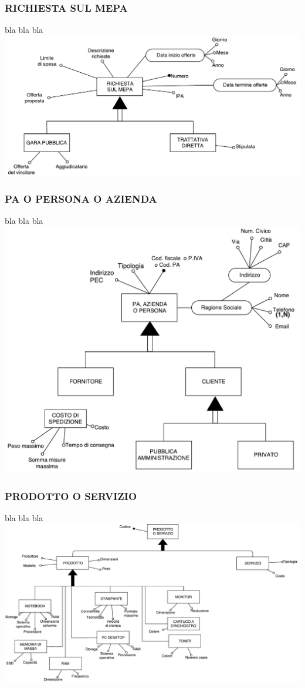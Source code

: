 \subsubsection{RICHIESTA SUL MEPA}
bla bla bla
\includegraphics[width=0.7\linewidth]{./immagini/richiesta_sul_mepa.pdf}

\subsubsection{PA O PERSONA O AZIENDA}
bla bla bla
\includegraphics[width=0.7\linewidth]{./immagini/pa_persona_o_azienda.pdf}

\subsubsection{PRODOTTO O SERVIZIO}
bla bla bla
\includegraphics[width=0.7\linewidth]{./immagini/prodotto_servizio.pdf}

